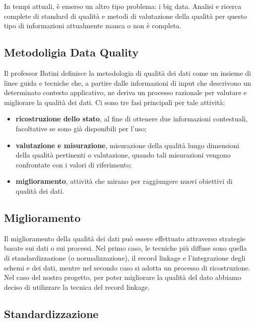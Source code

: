 \documentclass[a4paper,12pt]{article}
\begin{document}
In tempi attuali, è emerso un altro tipo problema: i big data. Analisi e ricerca complete di standard di qualità e metodi di valutazione della qualità per questo tipo di informazioni attualmente manca o non è completa.

\subsection{Metodoligia Data Quality}

Il professor Batini definisce la metodologia di qualità dei dati come un insieme di linee guida e tecniche che, a partire dalle informazioni di input che descrivono un determinato contesto applicativo, ne deriva un processo razionale per valutare e migliorare la qualità dei dati. Ci sono tre fasi principali per tale attività:
\begin{itemize}
\item \textbf{ricostruzione dello stato}, al fine di ottenere due informazioni contestuali, facoltative se sono già disponibili per l'uso;
\item \textbf{valutazione e misurazione}, misurazione della qualità lungo dimensioni della qualità pertinenti o valutazione, quando tali misurazioni vengono confrontate con i valori di riferimento;
\item \textbf{miglioramento}, attività che mirano per raggiungere nuovi obiettivi di qualità dei dati.
\end{itemize}

\subsection{Miglioramento}

Il miglioramento della qualità dei dati può essere effettuato attraverso strategie basate sui dati o sui processi. Nel primo caso, le tecniche più diffuse sono quella di standardizzazione (o normalizzazione), il record linkage e l'integrazione degli schemi e dei dati, mentre nel secondo caso si adotta un processo di ricostruzione. Nel caso del nostro progetto, per poter migliorare la qualità del dato abbiamo deciso di utilizzare la tecnica del record linkage. %

\subsection{Standardizzazione}
\end{document}

